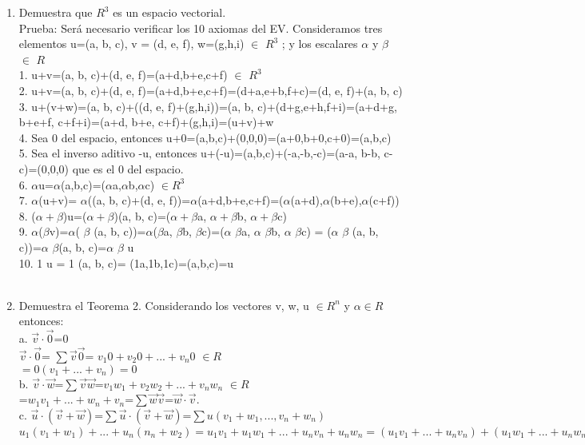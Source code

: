 \documentclass{article}
\begin{document}
\begin{enumerate}
\item[1.]Demuestra que $R^{3}$ es un espacio vectorial.\\ 
Prueba: Será necesario verificar los 10 axiomas del EV. Consideramos tres elementos u=(a, b, c), v = (d, e, f), w=(g,h,i) $\in$ $R^{3}$ ; y los escalares $\alpha$ y  $\beta$ $\in$ $R$\\
1. u+v=(a, b, c)+(d, e, f)=(a+d,b+e,c+f) $\in$ $R^{3}$ \\
2. u+v=(a, b, c)+(d, e, f)=(a+d,b+e,c+f)=(d+a,e+b,f+c)=(d, e, f)+(a, b, c)\\
3. u+(v+w)=(a, b, c)+((d, e, f)+(g,h,i))=(a, b, c)+(d+g,e+h,f+i)=(a+d+g, b+e+f, c+f+i)=(a+d, b+e, c+f)+(g,h,i)=(u+v)+w\\
4. Sea 0 del espacio, entonces u+0=(a,b,c)+(0,0,0)=(a+0,b+0,c+0)=(a,b,c)\\
5. Sea el inverso aditivo -u, entonces u+(-u)=(a,b,c)+(-a,-b,-c)=(a-a, b-b, c-c)=(0,0,0) que es el 0 del espacio.\\
6. $\alpha$u=$\alpha$(a,b,c)=($\alpha$a,$\alpha$b,$\alpha$c) $\in R^{3}$\\
7. $\alpha$(u+v)= $\alpha$((a, b, c)+(d, e, f))=$\alpha$(a+d,b+e,c+f)=($\alpha$(a+d),$\alpha$(b+e),$\alpha$(c+f))\\
8. ($\alpha +\beta$)u=($\alpha + \beta$)(a, b, c)=($\alpha + \beta$a, $\alpha + \beta$b, $\alpha + \beta$c)\\
9. $\alpha$($\beta$v)=$\alpha$( $\beta$ (a, b, c))=$\alpha$($\beta$a, $\beta$b, $\beta$c)=($\alpha$ $\beta$a, $\alpha$ $\beta$b, $\alpha$ $\beta$c) = ($\alpha$ $\beta$ (a, b, c))=$\alpha$ $\beta$(a, b, c)=$\alpha$ $\beta$ u\\
10. 1 u = 1 (a, b, c)= (1a,1b,1c)=(a,b,c)=u\\\\
\item[b)]Demuestra el Teorema 2. Considerando los vectores v, w, u $\in R^{n} $ y $\alpha \in R$ entonces:\\
a. $\vec{v} \cdot \vec{0}$=0\\
$\vec{v} \cdot \vec{0}$= $\sum \vec{v} \vec{0}$= $v_{1}0+v_{2}0+...+v_{n}0$ $\in R$\\
$=0(v_{1}+...+v_{n})=0$\\
b. $\vec{v} \cdot \vec{w}$=$\sum \vec{v} \vec{w}$=$v_{1}w_{1}+v_{2}w_{2}+...+v_{n}w_{n}$ $\in R$\\
=$w_{1}v_{1}+...+w_{n}+v_{n}$=$\sum \vec{w} \vec{v}$=$\vec{w} \cdot \vec{v}$.\\
c. $\vec{u} \cdot (\vec{v} + \vec{w})$=$\sum \vec{u} \cdot (\vec{v} + \vec{w})$=$\sum u(v_{1}+w_{1}, ..., v_{n}+w_{n})$\\
$u_{1}(v_{1}+w_{1})+...+u_{n}(n_{n}+w_{2})=u_{1}v_{1}+u_{1}w_{1}+...+u_{n}v_{n}+u_{n}w_{n}= (u_{1}v_{1}+...+u_{n}v_{n})+(u_{1}w_{1}+...+u_{n}w_{n})=\sum \vec{u}  \vec{v} + \sum \vec{u}  \vec{w} = \vec{u} \cdot \vec{v} + \vec{u} \cdot \vec{w}$
\end{enumerate}
\end{document}
